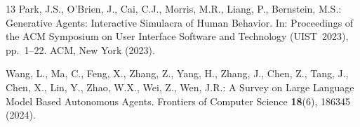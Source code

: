 \documentclass[runningheads]{llncs}
\begin{document}
\begin{thebibliography}{13}
Park, J.S., O'Brien, J., Cai, C.J., Morris, M.R., Liang, P., Bernstein, M.S.: Generative Agents: Interactive Simulacra of Human Behavior. In: Proceedings of the ACM Symposium on User Interface Software and Technology (UIST~2023), pp.~1--22. ACM, New York (2023). 

Wang, L., Ma, C., Feng, X., Zhang, Z., Yang, H., Zhang, J., Chen, Z., Tang, J., Chen, X., Lin, Y., Zhao, W.X., Wei, Z., Wen, J.R.: A Survey on Large Language Model Based Autonomous Agents. Frontiers of Computer Science \textbf{18}(6), 186345 (2024). 

\end{thebibliography}
\end{document}
